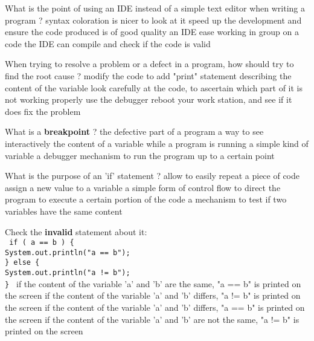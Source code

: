 
\begin{question}{
What is the point of using an IDE instead of a simple text editor when writing a program ?
}
  \false syntax coloration is nicer to look at
  \true  it speed up the development and ensure the code produced is of good quality
  \false an IDE ease working in group on a code
  \false the IDE can compile and check if the code is valid
\end{question}

\begin{question}{
When trying to resolve a problem or a defect in a program, how should try to find the root cause ?
}
  \false modify the code to add "print" statement describing the content of the variable
  \false look carefully at the code, to ascertain which part of it is not working properly
  \true use the debugger
  \false reboot your work station, and see if it does fix the problem
\end{question}

\begin{question}{
What is a \textbf{breakpoint} ?
}
  \false the defective part of a program
  \false a way to see interactively the content of a variable while a program is running
  \false a simple kind of variable
  \true a debugger mechanism to run the program up to a certain point
\end{question}

\begin{question}{
What is the purpose of an 'if' statement ?
}
  \false allow to easily repeat a piece of code
  \false assign a new value to a variable
  \true a simple form of control flow to direct the program to execute a certain portion of the code
  \false a mechanism to test if two variables have the same content
\end{question}

\begin{question}{
Check the \textbf{invalid} statement about it:\\
\small{
  \texttt{
    if ( a == b ) \{ \\
      \vspace{4pt} System.out.println("a == b"); \\
    \} else \{  \\
      \vspace{4pt} System.out.println("a != b");  \\
    \}
  }
}
}
  \false if the content of the variable 'a' and 'b' are the same, "a == b" is printed on the screen
  \false if the content of the variable 'a' and 'b' differs, "a != b" is printed on the screen
  \true if the content of the variable 'a' and 'b' differs, "a == b" is printed on the screen
  \false if the content of the variable 'a' and 'b' are not the same, "a != b" is printed on the screen
\end{question}

